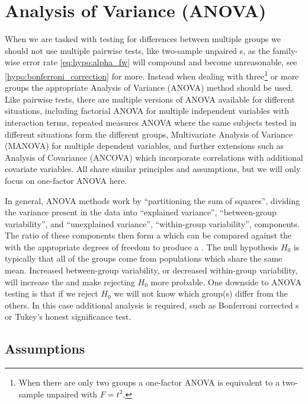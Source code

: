 \section{Analysis of Variance (ANOVA)}
\label{hypo:ANOVA}

When we are tasked with testing for differences between multiple groups
we should not use multiple pairwise tests, like two-sample unpaired {\ttest}s,
as the family-wise error rate \cref{eq:hypo:alpha_fw}
will compound and become unreasonable, see \cref{hypo:bonferroni_correction} for more.
Instead when dealing with three\footnote{When there are only two groups a one-factor ANOVA is equivalent to a two-sample unpaired \ttest with $F=t^{2}$.} or more groups
the appropriate Analysis of Variance (ANOVA) method should be used.
Like pairwise tests, there are multiple versions of ANOVA available for different situations, including
factorial ANOVA for multiple independent variables with interaction terms,
repeated measures ANOVA where the same subjects tested in different situations form the different groups,
Multivariate Analysis of Variance (MANOVA) for multiple dependent variables,
and further extensions such as Analysis of Covariance (ANCOVA) which incorporate correlations with additional covariate variables.
All share similar principles and assumptions,
but we will only focus on one-factor ANOVA here.

In general, ANOVA methods work by ``partitioning the sum of squares'',
\ie dividing the variance present in the data into
``explained variance'', \ie ``between-group variability'',
and
``unexplained variance'', \ie ``within-group variability'',
components.
The ratio of these components then form a \Fstat
which can be compared against the \Fdist
with the appropriate degrees of freedom to produce a \pvalue.
The null hypothesis $H_{0}$ is typically that all of the groups come from populations which share the same mean.
Increased between-group variability, or decreased within-group variability,
will increase the \Fstat and make rejecting $H_{0}$ more probable.
One downside to ANOVA testing is that if we reject $H_{0}$
we will not know which group(s) differ from the others.
In this case additional \posthoc analysis is required,
such as Bonferroni corrected {\ttest}s or Tukey's honest significance test.

\subsection{Assumptions}
\label{hypo:ANOVA:assumptions}

